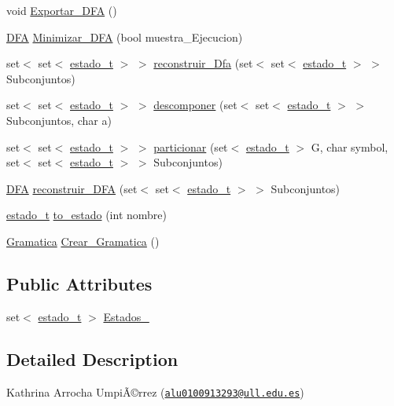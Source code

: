 \begin{DoxyCompactItemize}
void \hyperlink{class_d_f_a_abcfd9884cece764167a8c3c8fa083497}{Exportar\+\_\+\+D\+FA} ()
\item 
\hyperlink{class_d_f_a}{D\+FA} \hyperlink{class_d_f_a_a9dc081c267475f9d5099dfff03ced6a2}{Minimizar\+\_\+\+D\+FA} (bool muestra\+\_\+\+Ejecucion)
\item 
set$<$ set$<$ \hyperlink{classestado__t}{estado\+\_\+t} $>$ $>$ \hyperlink{class_d_f_a_ac38ab36866af60c6948dfb20f713b9d6}{reconstruir\+\_\+\+Dfa} (set$<$ set$<$ \hyperlink{classestado__t}{estado\+\_\+t} $>$ $>$ Subconjuntos)
\item 
set$<$ set$<$ \hyperlink{classestado__t}{estado\+\_\+t} $>$ $>$ \hyperlink{class_d_f_a_a3c6637fde6efa43f75399b6407636cda}{descomponer} (set$<$ set$<$ \hyperlink{classestado__t}{estado\+\_\+t} $>$ $>$ Subconjuntos, char a)
\item 
set$<$ set$<$ \hyperlink{classestado__t}{estado\+\_\+t} $>$ $>$ \hyperlink{class_d_f_a_a228e7a01035c7ea79794111a0644b1a3}{particionar} (set$<$ \hyperlink{classestado__t}{estado\+\_\+t} $>$ G, char symbol, set$<$ set$<$ \hyperlink{classestado__t}{estado\+\_\+t} $>$ $>$ Subconjuntos)
\item 
\hyperlink{class_d_f_a}{D\+FA} \hyperlink{class_d_f_a_a0e0bb665a8738f1fd8d4062cd8301fcc}{reconstruir\+\_\+\+D\+FA} (set$<$ set$<$ \hyperlink{classestado__t}{estado\+\_\+t} $>$ $>$ Subconjuntos)
\item 
\hyperlink{classestado__t}{estado\+\_\+t} \hyperlink{class_d_f_a_ad92a42b4d642834add9a14f85b3c1aa7}{to\+\_\+estado} (int nombre)
\item 
\hyperlink{class_gramatica}{Gramatica} \hyperlink{class_d_f_a_a2ea435af1720ebc8b478cb15200bd825}{Crear\+\_\+\+Gramatica} ()
\end{DoxyCompactItemize}
\subsection*{Public Attributes}
\begin{DoxyCompactItemize}
\item 
set$<$ \hyperlink{classestado__t}{estado\+\_\+t} $>$ \hyperlink{class_d_f_a_a6030e3446246552a16a7de723b08964e}{Estados\+\_\+}
\end{DoxyCompactItemize}


\subsection{Detailed Description}
Kathrina Arrocha UmpiÃ©rrez (\href{mailto:alu0100913293@ull.edu.es}{\tt alu0100913293@ull.\+edu.\+es})

